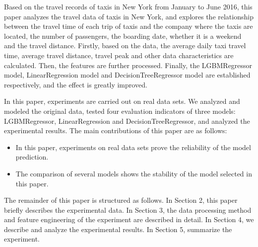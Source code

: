 Based on the travel records of taxis in New York from January to June 2016, this paper analyzes the travel data of taxis in New York, and explores the relationship between the travel time of each trip of taxis and the company where the taxis are located, the number of passengers, the boarding date, whether it is a weekend and the travel distance. Firstly, based on the data, the average daily taxi travel time, average travel distance, travel peak and other data characteristics are calculated. Then, the features are further processed. Finally, the LGBMRegressor model, LinearRegression model and DecisionTreeRegressor model are established respectively, and the effect is greatly improved.

In this paper, experiments are carried out on real data sets. We analyzed and modeled the original data, tested four evaluation indicators of three models: LGBMRegressor, LinearRegression and DecisionTreeRegressor, and analyzed the experimental results. The main contributions of this paper are as follows:

\begin{itemize}
	\item In this paper, experiments on real data sets prove the reliability of the model prediction.
	\item The comparison of several models shows the stability of the model selected in this paper.
\end{itemize}




The remainder of this paper is structured as follows. In Section 2, this paper briefly describes the experimental data. In Section 3, the data processing method and feature engineering of the experiment are described in detail. In Section 4, we describe and analyze the experimental results. In Section 5, summarize the experiment.





